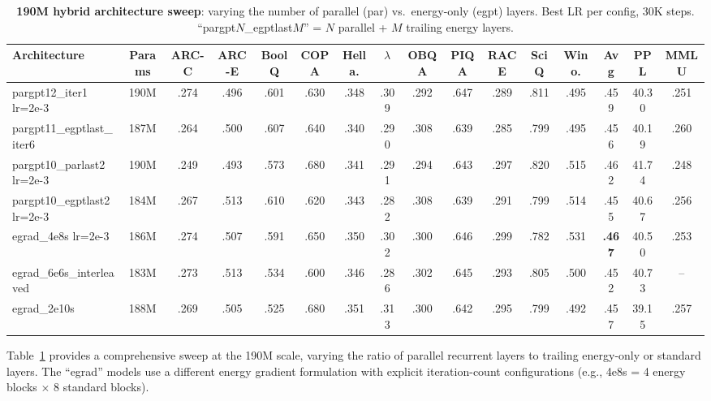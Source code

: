 \documentclass[oneside]{article}
\begin{document}
\begin{table}[t]
\centering
\caption{\textbf{190M hybrid architecture sweep}: varying the number of parallel (par) vs.\ energy-only (egpt) layers. Best LR per config, 30K steps. ``pargpt$N$\_egptlast$M$'' = $N$ parallel + $M$ trailing energy layers.}
\label{tab:190m_sweep}
\begin{adjustbox}{max width=\textwidth}
\begin{tabular}{l|c|ccccccccccc|c|c|c}
\toprule
\textbf{Architecture} & \textbf{Params} & \textbf{ARC-C} & \textbf{ARC-E} & \textbf{BoolQ} & \textbf{COPA} & \textbf{Hella.} & \textbf{$\lambda$} & \textbf{OBQA} & \textbf{PIQA} & \textbf{RACE} & \textbf{SciQ} & \textbf{Wino.} & \textbf{Avg} & \textbf{PPL} & \textbf{MMLU} \\
\midrule
pargpt12\_iter1 lr=2e-3         & 190M & .274 & .496 & .601 & .630 & .348 & .309 & .292 & .647 & .289 & .811 & .495 & .459 & 40.30 & .251 \\
pargpt11\_egptlast\_iter6       & 187M & .264 & .500 & .607 & .640 & .340 & .290 & .308 & .639 & .285 & .799 & .495 & .456 & 40.19 & .260 \\
pargpt10\_parlast2 lr=2e-3      & 190M & .249 & .493 & .573 & .680 & .341 & .291 & .294 & .643 & .297 & .820 & .515 & .462 & 41.74 & .248 \\
pargpt10\_egptlast2 lr=2e-3     & 184M & .267 & .513 & .610 & .620 & .343 & .282 & .308 & .639 & .291 & .799 & .514 & .455 & 40.67 & .256 \\
\midrule
egrad\_4e8s lr=2e-3             & 186M & .274 & .507 & .591 & .650 & .350 & .302 & .300 & .646 & .299 & .782 & .531 & \textbf{.467} & 40.50 & .253 \\
egrad\_6e6s\_interleaved        & 183M & .273 & .513 & .534 & .600 & .346 & .286 & .302 & .645 & .293 & .805 & .500 & .452 & 40.73 & -- \\
egrad\_2e10s                    & 188M & .269 & .505 & .525 & .680 & .351 & .313 & .300 & .642 & .295 & .799 & .492 & .457 & 39.15 & .257 \\
\bottomrule
\end{tabular}
\end{adjustbox}
\end{table}

Table~\ref{tab:190m_sweep} provides a comprehensive sweep at the 190M scale, varying the ratio of parallel recurrent layers to trailing energy-only or standard layers. The ``egrad'' models use a different energy gradient formulation with explicit iteration-count configurations (e.g., 4e8s = 4 energy blocks $\times$ 8 standard blocks).
\end{document}
